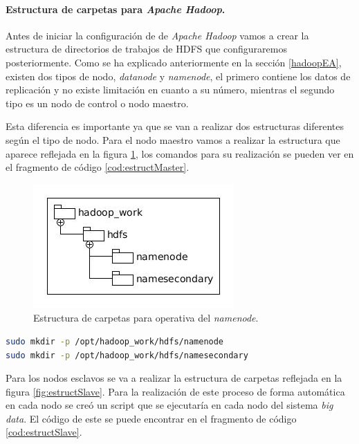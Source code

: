 \paragraph{Estructura de carpetas para \textit{Apache Hadoop}.} Antes de iniciar la configuración de de \textit{Apache Hadoop} vamos a crear la estructura de directorios de trabajos de \gls{HDFS} que configuraremos posteriormente. Como se ha explicado anteriormente en la sección \ref{hadoopEA}, existen dos tipos de nodo, \textit{datanode} y \textit{namenode}, el primero contiene los datos de replicación y no existe limitación en cuanto a su número, mientras el segundo tipo es un nodo de control o nodo maestro. 

Esta diferencia es importante ya que se van a realizar dos estructuras diferentes según el tipo de nodo. Para el nodo maestro vamos a realizar la estructura que aparece reflejada en la figura \ref{fig:estructMaster}, los comandos para su realización se pueden ver en el fragmento de código \ref{cod:estructMaster}.

\begin{figure}[htp!] 
	\centering		
	\caption{Estructura de carpetas para operativa del \textit{namenode}.}
	\label{fig:estructMaster}
	\vspace{5pt}
	\includegraphics[scale=0.8]{graphics/estructMaster}
\end{figure}

\begin{lstlisting}[label=cod:estructMaster,language=sh,frame=single,caption=Codigo de creación de la estructura de carpetas del \textit{namenode}.]
sudo mkdir -p /opt/hadoop_work/hdfs/namenode
sudo mkdir -p /opt/hadoop_work/hdfs/namesecondary
\end{lstlisting}

Para los nodos esclavos se va a realizar la estructura de carpetas reflejada en la figura \ref{fig:estructSlave}. Para la realización de este proceso de forma automática en cada nodo se creó un script que se ejecutaría en cada nodo del sistema \textit{big data}. El código de este se puede encontrar en el fragmento de código \ref{cod:estructSlave}.


